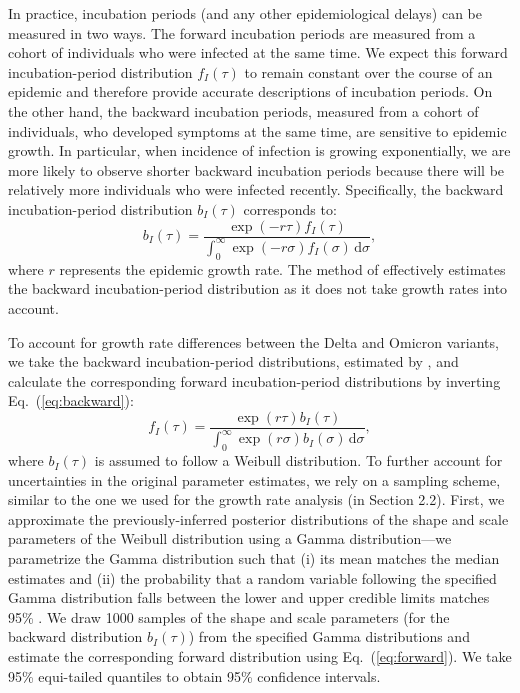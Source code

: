 \documentclass[12pt]{article}
\newcommand{\eref}[1]{Eq.~(\ref{eq:#1})}
\newcommand{\dd}[1]{\ensuremath{\, \mathrm{d}#1}}
\newcommand{\dsigma}{\dd{\sigma}}
\begin{document}
In practice, incubation periods (and any other epidemiological delays) can be measured in two ways.
The forward incubation periods are measured from a cohort of individuals who were infected at the same time. 
We expect this forward incubation-period distribution $f_I(\tau)$ to remain constant over the course of an epidemic and therefore provide accurate descriptions of incubation periods.
On the other hand, the backward incubation periods, measured from a cohort of individuals, who developed symptoms at the same time, are sensitive to epidemic growth.
In particular, when incidence of infection is growing exponentially, we are more likely to observe shorter backward incubation periods because there will be relatively more individuals who were infected recently.
Specifically, the backward incubation-period distribution $b_I(\tau)$ corresponds to:
\begin{equation}
b_I(\tau) =\frac{ \exp(-r\tau) f_I(\tau)}{\int_0^\infty \exp(-r\sigma) f_I(\sigma)  \dsigma},
\label{eq:backward}
\end{equation}
where $r$ represents the epidemic growth rate.
The method of \cite{backer2020incubation} effectively estimates the backward incubation-period distribution as it does not take growth rates into account.

To account for growth rate differences between the Delta and Omicron variants, we take the backward incubation-period distributions, estimated by \cite{backer2021omicron}, and calculate the corresponding forward incubation-period distributions by inverting \eref{backward}:
\begin{equation}
f_I(\tau) = \frac{\exp(r\tau) b_I(\tau) }{\int_0^\infty \exp(r\sigma)  b_I(\sigma)\dsigma},
\label{eq:forward}
\end{equation}
where $b_I(\tau)$ is assumed to follow a Weibull distribution.
To further account for uncertainties in the original parameter estimates, we rely on a sampling scheme, similar to the one we used for the growth rate analysis (in Section 2.2).
First, we approximate the previously-inferred posterior distributions of the shape and scale parameters of the Weibull distribution using a Gamma distribution---we parametrize the Gamma distribution such that (i) its mean matches the median estimates and (ii) the probability that a random variable following the specified Gamma distribution falls between the lower and upper credible limits matches 95\% \citep{park2020reconciling}.
We draw 1000 samples of the shape and scale parameters (for the backward distribution $b_I(\tau)$) from the specified Gamma distributions and estimate the corresponding forward distribution using \eref{forward}.
We take 95\% equi-tailed quantiles to obtain 95\% confidence intervals. 
\end{document}

